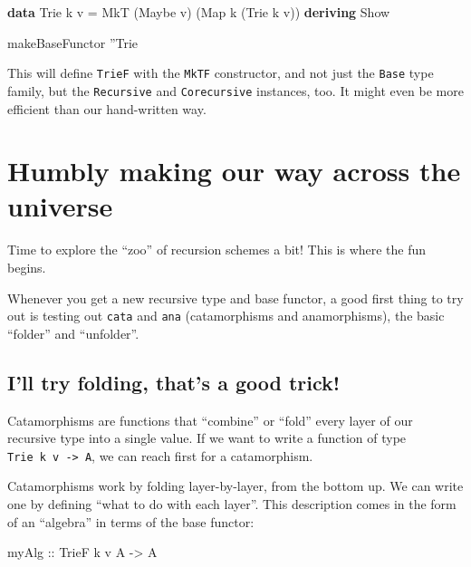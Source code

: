 \documentclass[]{article}
\newenvironment{Shaded}{}{}
\newcommand{\DataTypeTok}[1]{\textcolor[rgb]{0.56,0.13,0.00}{#1}}
\newcommand{\FunctionTok}[1]{\textcolor[rgb]{0.02,0.16,0.49}{#1}}
\newcommand{\KeywordTok}[1]{\textcolor[rgb]{0.00,0.44,0.13}{\textbf{#1}}}
\newcommand{\NormalTok}[1]{#1}
\newcommand{\OtherTok}[1]{\textcolor[rgb]{0.00,0.44,0.13}{#1}}
\begin{document}
\begin{Shaded}
\begin{Highlighting}[]
\KeywordTok{data} \DataTypeTok{Trie}\NormalTok{ k v }\FunctionTok{=} \DataTypeTok{MkT}\NormalTok{ (}\DataTypeTok{Maybe}\NormalTok{ v) (}\DataTypeTok{Map}\NormalTok{ k (}\DataTypeTok{Trie}\NormalTok{ k v))}
  \KeywordTok{deriving} \DataTypeTok{Show}

\NormalTok{makeBaseFunctor ''}\DataTypeTok{Trie}
\end{Highlighting}
\end{Shaded}

This will define \texttt{TrieF} with the \texttt{MkTF} constructor, and not just
the \texttt{Base} type family, but the \texttt{Recursive} and
\texttt{Corecursive} instances, too. It might even be more efficient than our
hand-written way.

\hypertarget{humbly-making-our-way-across-the-universe}{%
\section{Humbly making our way across the
universe}\label{humbly-making-our-way-across-the-universe}}

Time to explore the ``zoo'' of recursion schemes a bit! This is where the fun
begins.

Whenever you get a new recursive type and base functor, a good first thing to
try out is testing out \texttt{cata} and \texttt{ana} (catamorphisms and
anamorphisms), the basic ``folder'' and ``unfolder''.

\hypertarget{ill-try-folding-thats-a-good-trick}{%
\subsection{I'll try folding, that's a good
trick!}\label{ill-try-folding-thats-a-good-trick}}

Catamorphisms are functions that ``combine'' or ``fold'' every layer of our
recursive type into a single value. If we want to write a function of type
\texttt{Trie\ k\ v\ -\textgreater{}\ A}, we can reach first for a catamorphism.

Catamorphisms work by folding layer-by-layer, from the bottom up. We can write
one by defining ``what to do with each layer''. This description comes in the
form of an ``algebra'' in terms of the base functor:

\begin{Shaded}
\begin{Highlighting}[]
\OtherTok{myAlg ::} \DataTypeTok{TrieF}\NormalTok{ k v }\DataTypeTok{A} \OtherTok{->} \DataTypeTok{A}
\end{Highlighting}
\end{Shaded}
\end{document}
